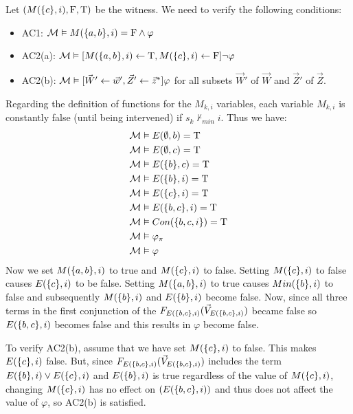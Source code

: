 \begin{example}
    Let $(M(\{c\},i),\mathrm{F},\mathrm{T})$ be the witness.
    We need to verify the following conditions:
    \begin{itemize}
        \item AC1:  $\mathcal{M} \vDash M(\{a,b\},i) = \mathrm{F} \wedge \varphi$
        \item AC2(a): $\mathcal{M}\vDash [M(\{a,b\},i)\leftarrow \mathrm{T},M(\{c\},i)\leftarrow \mathrm{F}] \neg \varphi$
        \item AC2(b): $\mathcal{M} \vDash [\vec W' \leftarrow \vec w', \vec Z' \leftarrow \vec z^* ]\varphi$
              for all subsets
              $\vec W'$ of $\vec W$ and $\vec Z'$ of $\vec Z$.
    \end{itemize}
    Regarding the definition of functions for the $M_{k,i}$ variables,
    each variable $M_{k,i}$ is constantly false (until being intervened)
    if $s_k \not \vdash_{min} i$.
    Thus we have:
    \begin{align*}
        \mathcal{M} & \vDash E(\emptyset, b) = \mathrm{T}       \\
        \mathcal{M} & \vDash E(\emptyset, c) = \mathrm{T}       \\
        \mathcal{M} & \vDash E(\{b\},c) = \mathrm{T}     \\
        \mathcal{M} & \vDash E(\{b\},i ) = \mathrm{T}    \\
        \mathcal{M} & \vDash E(\{c\},i ) = \mathrm{T}    \\
        \mathcal{M} & \vDash E(\{b,c\},i) = \mathrm{T}   \\
        \mathcal{M} & \vDash Con(\{b,c,i\}) = \mathrm{T} \\
        \mathcal{M} & \vDash \varphi_{\pi}       \\
        \mathcal{M} & \vDash \varphi
    \end{align*}
    Now we set $M(\{a,b\},i)$ to true and $M(\{c\},i)$ to false.
    Setting $M(\{c\},i)$ to false causes $E(\{c\},i)$ to be false.
    Setting $M(\{a,b\},i)$ to true causes $Min(\{b\},i)$ to false
    and subsequently $M(\{b\},i)$ and $E(\{b\},i)$ become false.
    Now, since all three terms in the first conjunction of the
    $F_{E(\{b,c\},i)}(\vec V_{E(\{b,c\},i)})$ became false so $E(\{b,c\},i)$ becomes false and 
    this results in $\varphi$ become false.

    To verify AC2(b), assume that we have set $M(\{c\},i)$ to false.
    This makes $E(\{c\},i)$ false.
    But, since $F_{E(\{b,c\},i)}(\vec V_{E(\{b,c\},i)})$ includes the term
    $E(\{b\},i) \vee E(\{c\},i)$ and $E(\{b\},i)$ is true regardless
    of the value of $M(\{c\},i)$, changing $M(\{c\},i)$ has
    no effect on $(E(\{b,c\},i))$ and thus does not affect
    the value of $\varphi$, so AC2(b) is satisfied.
\end{example}
